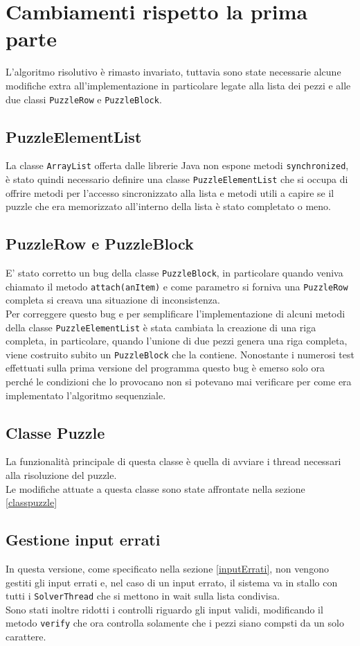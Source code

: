 \documentclass[a4paper, 11pt]{article}
\newcommand{\sync}{\texttt{synchronized}\xspace}
\begin{document}
\section{Cambiamenti rispetto la prima parte}
L'algoritmo risolutivo è rimasto invariato, tuttavia sono state necessarie alcune modifiche extra all'implementazione in particolare legate alla lista dei pezzi e alle due classi \texttt{PuzzleRow} e \texttt{PuzzleBlock}.

\subsection{PuzzleElementList}\label{puzzleElementList}
La classe \texttt{ArrayList} offerta dalle librerie Java non espone metodi \sync, è stato quindi necessario definire una classe \texttt{PuzzleElementList} che si occupa di offrire metodi per l'accesso sincronizzato alla lista e metodi utili a capire se il puzzle che era memorizzato all'interno della lista è stato completato o meno.

\subsection{PuzzleRow e PuzzleBlock}
E' stato corretto un bug della classe \texttt{PuzzleBlock}, in particolare quando veniva chiamato il metodo \texttt{attach(anItem)} e come parametro si forniva una \texttt{PuzzleRow} completa si creava una situazione di inconsistenza. \\
Per correggere questo bug e per semplificare l'implementazione di alcuni metodi della classe \texttt{PuzzleElementList} è stata cambiata la creazione di una riga completa, in particolare, quando l'unione di due pezzi genera una riga completa, viene costruito subito un \texttt{PuzzleBlock} che la contiene.
Nonostante i numerosi test effettuati sulla prima versione del programma questo bug è emerso solo ora perché le condizioni che lo provocano non si potevano mai verificare per come era implementato l'algoritmo sequenziale.  

\subsection{Classe Puzzle}
La funzionalità principale di questa classe è quella di avviare i thread necessari alla risoluzione del puzzle. \\
Le modifiche attuate a questa classe sono state affrontate nella sezione \ref{classpuzzle}

\subsection{Gestione input errati}
In questa versione, come specificato nella sezione \ref{inputErrati}, non vengono gestiti gli input errati e, nel caso di un input errato, il sistema va in stallo con tutti i \texttt{SolverThread} che si mettono in wait sulla lista condivisa.\\
Sono stati inoltre ridotti i controlli riguardo gli input validi, modificando il metodo \texttt{verify} che ora controlla solamente che i pezzi siano compsti da un solo carattere.
\end{document}
